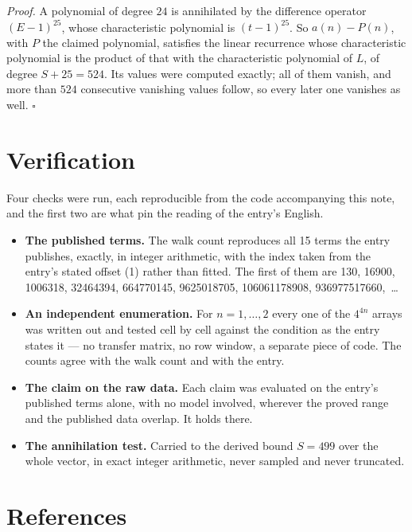 \documentclass[11pt]{article}
\theoremstyle{definition}
\begin{document}
{\itshape Proof.} A polynomial of degree $24$ is annihilated by the difference operator $(E-1)^{25}$, whose characteristic polynomial is $(t-1)^{25}$. So $a(n) - P(n)$, with $P$ the claimed polynomial, satisfies the linear recurrence whose characteristic polynomial is the product of that with the characteristic polynomial of $L$, of degree $S + 25 = 524$. Its values were computed exactly; all of them vanish, and more than $524$ consecutive vanishing values follow, so every later one vanishes as well. $\square$

\section{Verification}

Four checks were run, each reproducible from the code accompanying this note, and the first two are what pin the reading of the entry's English.

\begin{itemize}

\item {\bfseries The published terms.} The walk count reproduces all 15 terms the entry publishes, exactly, in integer arithmetic, with the index taken from the entry's stated offset (1) rather than fitted. The first of them are 130, 16900, 1006318, 32464394, 664770145, 9625018705, 106061178908, 936977517660,~\dots

\item {\bfseries An independent enumeration.} For $n = 1,\dots,2$ every one of the $4^{4n}$ arrays was written out and tested cell by cell against the condition as the entry states it --- no transfer matrix, no row window, a separate piece of code. The counts agree with the walk count and with the entry.

\item {\bfseries The claim on the raw data.} Each claim was evaluated on the entry's published terms alone, with no model involved, wherever the proved range and the published data overlap. It holds there.

\item {\bfseries The annihilation test.} Carried to the derived bound $S = 499$ over the whole vector, in exact integer arithmetic, never sampled and never truncated.

\end{itemize}

\section{References}
\end{document}
